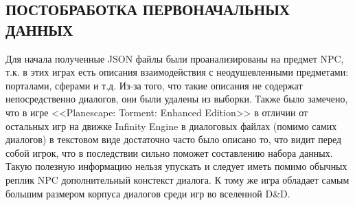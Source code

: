\subsection{ПОСТОБРАБОТКА ПЕРВОНАЧАЛЬНЫХ ДАННЫХ}

Для начала полученные JSON файлы были проанализированы на предмет NPC, т.к. в этих играх есть описания взаимодействия с неодушевленными предметами: порталами, сферами и т.д. Из-за того, что такие описания не содержат непосредственно диалогов, они были удалены из выборки. Также было замечено, что в игре <<Planescape: Torment: Enhanced Edition>> в отличии от остальных игр на движке Infinity Engine в диалоговых файлах (помимо самих диалогов) в текстовом виде достаточно часто было описано то, что видит перед собой игрок, что в последствии сильно поможет составлению набора данных. Такую полезную информацию нельзя упускать и следует иметь помимо обычных реплик NPC дополнительный констекст диалога. К тому же игра обладает самым большим размером корпуса диалогов среди игр во вселенной D\&D.